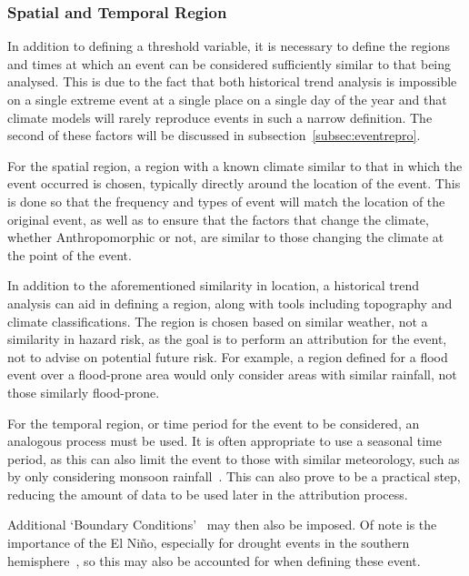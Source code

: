 \subsubsection{Spatial and Temporal Region}

In addition to defining a threshold variable,
    it is necessary to define the regions and times at which an event can be considered sufficiently similar to that being analysed.
This is due to the fact that both historical trend analysis is impossible on a single extreme event at a single place on a single day of the year
    and that climate models will rarely reproduce events in such a narrow definition.
The second of these factors will be discussed in subsection~\ref{subsec:eventrepro}.

For the spatial region,
    a region with a known climate similar to that in which the event occurred is chosen,
    typically directly around the location of the event.
This is done so that the frequency and types of event will match the location of the original event,
    as well as to ensure that the factors that change the climate,
    whether Anthropomorphic or not,
    are similar to those changing the climate at the point of the event.

In addition to the aforementioned similarity in location,
    a historical trend analysis can aid in defining a region,
    along with tools including topography and climate classifications.
The region is chosen based on similar weather,
    not a similarity in hazard risk,
    as the goal is to perform an attribution for the event,
    not to advise on potential future risk.
For example,
    a region defined for a flood event over a flood-prone area would only consider areas with similar rainfall,
    not those similarly flood-prone.

For the temporal region,
    or time period for the event to be considered,
    an analogous process must be used.
It is often appropriate to use a seasonal time period,
    as this can also limit the event to those with similar meteorology,
    such as by only considering monsoon rainfall~\cite{Otto_et_al_2023}.
This can also prove to be a practical step,
    reducing the amount of data to be used later in the attribution process.

Additional `Boundary Conditions'~\cite{van_Oldenborgh_et_al_2021} may then also be imposed.
Of note is the importance of the El Niño,
    especially for drought events in the southern hemisphere~\cite{Lyon_2004},
    so this may also be accounted for when defining these event.

